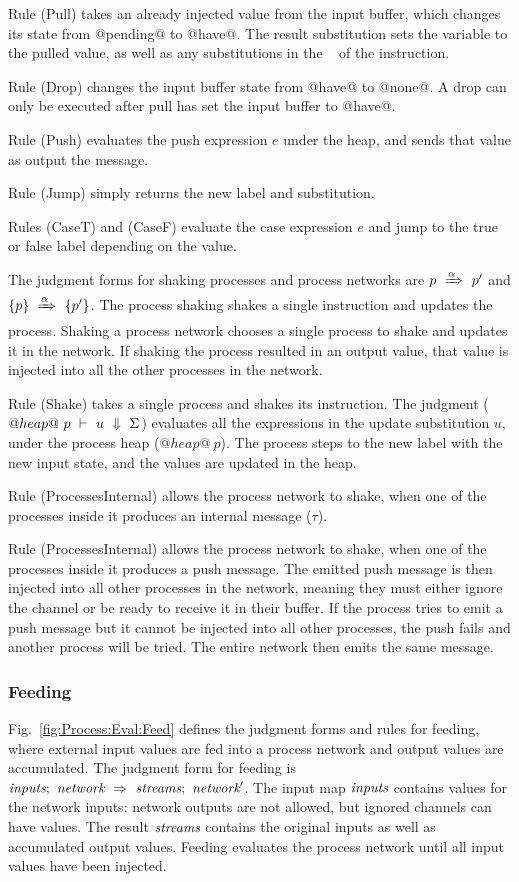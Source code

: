 Rule (Pull) takes an already injected value from the input buffer, which changes its state from @pending@ to @have@.
The result substitution sets the variable to the pulled value, as well as any substitutions in the \Next~ of the instruction.

Rule (Drop) changes the input buffer state from @have@ to @none@. A drop can only be executed after pull has set the input buffer to @have@.

Rule (Push) evaluates the push expression $e$ under the heap, and sends that value as output the message.

Rule (Jump) simply returns the new label and substitution.

Rules (CaseT) and (CaseF) evaluate the case expression $e$ and jump to the true or false label depending on the value.

The judgment forms for shaking processes and process networks are $p~\xRightarrow{\alpha}~p'$ and $\{ p \}~\xRightarrow{\alpha}~\{ p' \}$.
The process shaking shakes a single instruction and updates the process.
Shaking a process network chooses a single process to shake and updates it in the network.
If shaking the process resulted in an output value, that value is injected into all the other processes in the network.

Rule (Shake) takes a single process and shakes its instruction.
The judgment ($@heap@~p~\vdash~u~\Downarrow~\Sigma$) evaluates all the expressions in the update substitution $u$, under the process heap ($@heap@~p$).
The process steps to the new label with the new input state, and the values are updated in the heap.

Rule (ProcessesInternal) allows the process network to shake, when one of the processes inside it produces an internal message ($\tau$).

Rule (ProcessesInternal) allows the process network to shake, when one of the processes inside it produces a push message.
The emitted push message is then injected into all other processes in the network, meaning they must either ignore the channel or be ready to receive it in their buffer.
If the process tries to emit a push message but it cannot be injected into all other processes, the push fails and another process will be tried.
The entire network then emits the same message.

\subsubsection{Feeding}
Fig.~\ref{fig:Process:Eval:Feed} defines the judgment forms and rules for feeding, where external input values are fed into a process network and output values are accumulated.
The judgment form for feeding is $\textit{inputs};~\textit{network}~\Rightarrow~\textit{streams};~\textit{network}'$.
The input map $\textit{inputs}$ contains values for the network inputs: network outputs are not allowed, but ignored channels can have values.
The result $\textit{streams}$ contains the original inputs as well as accumulated output values.
Feeding evaluates the process network until all input values have been injected.

